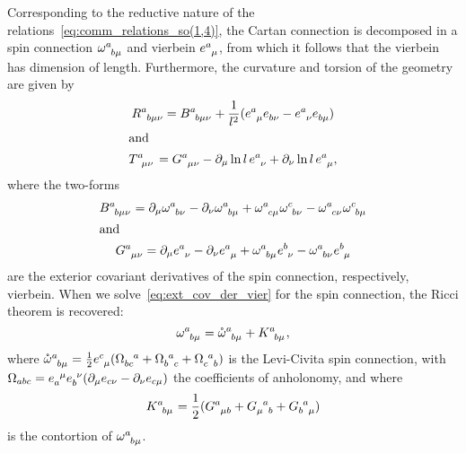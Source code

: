 \documentclass[%
aps,
prd,
reprint
]{revtex4-1}
\newcommand{\ind}{\indices}
\def\pd{\partial}
\def\mring{\mathring}
\begin{document}
Corresponding to the reductive nature of the 
relations~\eqref{eq:comm_relations_so(1,4)}, the Cartan 
connection is decomposed in a spin connection 
$\omega\ind{^a_{b\mu}}$ and vierbein $e\ind{^a_\mu}$, from which 
it follows that the vierbein has dimension of length.  
Furthermore, the curvature and torsion of the geometry are given 
by~\cite{Jennen:2014mba}
\begin{subequations}
\begin{gather}
\label{eq:nonlin_curv_dSC}
  R\ind{^a_{b\mu\nu}} = B\ind{^a_{b\mu\nu}} + \frac{1}{l^2} 
  (e\ind{^a_\mu} e\ind{_{b\nu}} - e\ind{^a_\nu} e\ind{_{b\mu}})
  \\
\shortintertext{and}
\label{eq:nonlin_tors_dSC}
  T\ind{^a_{\mu\nu}} = G\ind{^a_{\mu\nu}} - \pd_\mu \ln l\, 
  e\ind{^a_\nu} + \pd_\nu \ln l\, e\ind{^a_\mu},
\end{gather}
\end{subequations}
where the two-forms
\begin{subequations}
\begin{gather}
\label{eq:ext_cov_der_spin}
  B\ind{^a_{b\mu\nu}} = \pd_\mu \omega\ind{^a_{b\nu}} - \pd_\nu 
  \omega\ind{^a_{b\mu}} + \omega\ind{^a_{c\mu}} 
  \omega\ind{^c_{b\nu}} - \omega\ind{^a_{c\nu}} 
  \omega\ind{^c_{b\mu}}\\
\shortintertext{and}
\label{eq:ext_cov_der_vier}
  G\ind{^a_{\mu\nu}} = \pd_\mu e\ind{^a_\nu} - \pd_\nu 
  e\ind{^a_\mu} + \omega\ind{^a_{b\mu}} e\ind{^b_\nu} 
  - \omega\ind{^a_{b\nu}} e\ind{^b_\mu}
\end{gather}
\end{subequations}
are the exterior covariant derivatives of the spin connection, 
respectively, vierbein. When we solve~\eqref{eq:ext_cov_der_vier} 
for the spin connection, the Ricci theorem is recovered:
\begin{equation}
\label{eq:RicciTheor}
  \omega\ind{^a_{b\mu}} = \mring{\omega}\ind{^a_{b\mu}} 
  + K\ind{^a_{b\mu}},
\end{equation}
where $\mring{\omega}\ind{^a_{b\mu}} 
= \tfrac{1}{2}e\ind{^c_\mu}(\Omega\ind{_{bc}^a} 
+ \Omega\ind{_b^a_c} + \Omega\ind{_c^a_b})$ is the Levi-Civita 
spin connection, with $\Omega_{abc}  = e\ind{_a^\mu} 
e\ind{_b^\nu}(\pd_\mu e_{c\nu} - \pd_\nu e_{c\mu})$ the 
coefficients of anholonomy, and where
\begin{equation}
\label{eq:relContTors}
  K\ind{^a_{b\mu}} = \frac{1}{2} (G\ind{^a_{\mu b}} 
  + G\ind{_\mu^a_b} + G\ind{_b^a_\mu})
\end{equation}
is the contortion of $\omega\ind{^a_{b\mu}}$.
\end{document}
